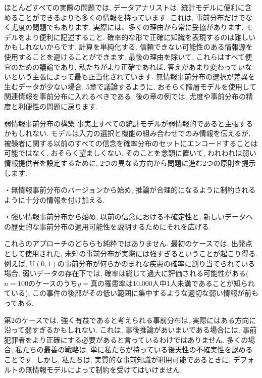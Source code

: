 \documentclass[10pt,dvipdfmx,a4]{beamer}
\begin{document}

\begin{frame}
ほとんどすべての実際の問題では, データアナリストは, 統計モデルに便利に含めることができるよりも多くの情報を持っています.
これは, 事前分布だけでなく尤度の問題でもあります.
実際には、多くの理由から常に妥協があります.
モデルをより便利に記述すること.
確率的な形で正確に知識を表現するのは難しいかもしれないからです.
計算を単純化する.
信頼できない可能性のある情報源を使用することを避けることができます.
最後の理由を除いて, これらはすべて便宜のための議論であり, 私たちがより正確であれば, 答えがあまり変わっていないという主張によって最も正当化されています.
無情報事前分布の選択が差異を生むデータが少ない場合, 5章で議論するように, おそらく階層モデルを使用して関連情報を事前分布に入れるべきである.
後の章の例では, 尤度や事前分布の精度と利便性の問題に戻ります.
\end{frame}


\begin{frame}{弱情報事前分布の構築}
事実上すべての統計モデルが弱情報的であると主張するかもしれない.
モデルは入力の選択と機能の組み合わせでのみ情報を伝えるが, 被験者に関する以前のすべての信念を確率分布のセットにエンコードすることは可能ではなく, おそらく望ましくない.
そのことを念頭に置いて, われわれは弱い情報提供者を設定するために, 2つの異なる方向から問題に進む2つの原則を提示します.

・無情報事前分布のバージョンから始め, 推論が合理的になるように制約されるように十分の情報を付け加える.

・強い情報事前分布から始め, 以前の信念における不確定性と, 新しいデータへの歴史的な事前分布の適用可能性を説明するためにそれを広げる.
\end{frame}


\begin{frame}
これらのアプローチのどちらも純粋ではありません.
最初のケースでは, 出発点として使用された, 未知の事前分布が実際には強すぎるということが起こり得る.
例えば, U$(0,1)$の事前分布が何らかのまれな疾患の確率に割り当てられている場合, 弱いデータの存在下では, 確率は総じて過大に評価される可能性がある($n = 100$のケースのうち$y =$真の罹患率は10,000人中1人未満であることが知られている), この事件の後部がその低い範囲に集中するような適切な弱い情報が前もってある.

第2のケースでは, 強く有益であると考えられる事前分布は, 実際にはある方向に沿って弱すぎるかもしれない.
これは, 事後推論があいまいである場合には, 事前犯罪者をより正確にする必要があると言っているわけではありません.
多くの場合, 私たちの最善の戦略は, 単に私たちが持っている後天性の不確実性を認めることです.
しかし, 私たちは, 実質的な事前知識が利用可能であるときに, デフォルトの無情報モデルによって制約を受けてはいけません.
\end{frame}
\end{document}
